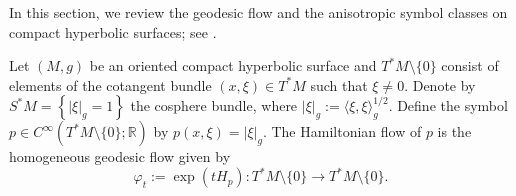 \documentclass[11pt,oneside,reqno]{amsart}
\theoremstyle{definition}
\numberwithin{equation}{section}
\theoremstyle{plain}
\begin{document}
In this section, we review the geodesic flow and the anisotropic symbol classes on compact hyperbolic surfaces; see \cite{dyatlovzahl2016spectral,dyatlov2018semiclassical}. 

Let $(M, g)$ be an oriented compact hyperbolic surface and $T^* M \setminus \{0\} $ consist of elements of the cotangent bundle $(x,\xi) \in T^*M$ such that $\xi \neq 0$. Denote by $S^* M=\left\{|\xi|_g=1\right\}$ the cosphere bundle, where $|\xi|_g:=\langle \xi,\xi\rangle_g^{1/2}$. Define the symbol $p \in C^{\infty}\left(T^* M \setminus \{0\} ;\mathbb{R}\right)$ by $p(x, \xi)=|\xi|_{g}$. The Hamiltonian flow of $p$ is the homogeneous geodesic flow given by
\begin{equation*}
    \varphi_t:=\exp \left(t H_p\right): T^* M \setminus \{0\} \rightarrow T^* M \setminus \{0\}.
\end{equation*}
\end{document}
